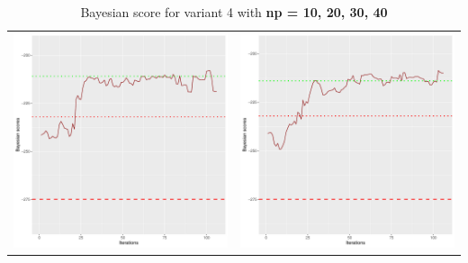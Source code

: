 \documentclass[]{scrartcl}
\begin{document}
\begin{table}[h!]
\begin{tabular}{cc}
\includegraphics[scale = 0.4]{./figs/asia/v4/30/bayBoundsEvolution-107.pdf} & 
\includegraphics[scale = 0.4]{./figs/asia/v4/40/bayBoundsEvolution-107.pdf} \\
\end{tabular}
\caption{Bayesian score for variant 4 with \textbf{np =  10, 20, 30, 40}}
\end{table}
\end{document}
